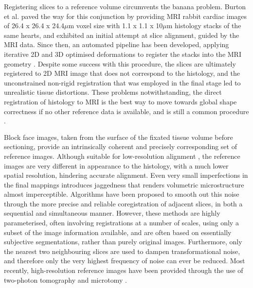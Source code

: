   Registering slices to a reference volume circumvents the banana problem. Burton et al. \cite{Burton2006} paved the way for this conjunction by providing MRI rabbit cardiac images of 26.4 x 26.4 x 24.4$\mu$m voxel size with 1.1 x 1.1 x 10$\mu$m histology stacks of the same hearts, and exhibited an initial attempt at slice alignment, guided by the MRI data. Since then, an automated pipeline has been developed, applying iterative 2D and 3D optimised deformations to register the stacks into the MRI geometry \cite{Mansoori2007}. Despite some success with this procedure, the slices are ultimately registered to 2D MRI image that does not correspond to the histology, and the unconstrained non-rigid registration that was employed in the final stage led to unrealistic tissue distortions. These problems notwithstanding, the direct registration of histology to MRI is the best way to move towards global shape correctness if no other reference data is available, and is still a common procedure \cite{Alic2011,Osechinskiy2011,Kimm2012}.
  
  Block face images, taken from the surface of the fixated tissue volume before sectioning, provide an intrinsically coherent and precisely corresponding set of reference images. Although suitable for low-resolution alignment  \cite{Palm2010}, the reference images are very different in appearance to the histology, with a much lower spatial resolution, hindering accurate alignment. Even very small imperfections in the final mappings introduces jaggedness that renders volumetric microstructure almost imperceptible. Algorithms have been proposed to smooth out this noise through the more precise and reliable coregistration of adjacent slices, in both a sequential \cite{Yushkevich2006,Chakravarty2008} and simultaneous \cite{Feuerstein2011} manner. However, these methods are highly parameterised, often involving registrations at a number of scales, using only a subset of the image information available, and are often based on essentially subjective segmentations, rather than purely original images. Furthermore, only the nearest two neighbouring slices are used to dampen transformational noise, and therefore only the very highest frequency of noise can ever be reduced. Most recently, high-resolution reference images have been provided through the use of two-photon tomography and microtomy \cite{Huang2009,Ragan2012}.
  
